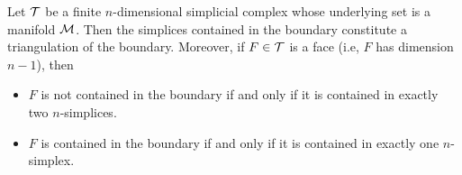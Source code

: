 \documentclass[10pt,a4paper]{article}
\begin{document}
\begin{lemma}\label{lemma:boundarysimplices}
    Let ${\mathcal T}$ be a finite $n$-dimensional simplicial complex whose underlying set is a manifold ${\mathcal M}$. 
    Then the simplices contained in the boundary constitute a triangulation of the boundary.
    Moreover, if $F \in {\mathcal T}$ is a face (i.e, $F$ has dimension $n-1$), then 
    \begin{itemize}
        \item $F$ is not contained in the boundary if and only if it is contained in exactly two $n$-simplices.
        \item $F$ is contained in the boundary if and only if it is contained in exactly one $n$-simplex.
    \end{itemize}
\end{lemma}
\end{document}
